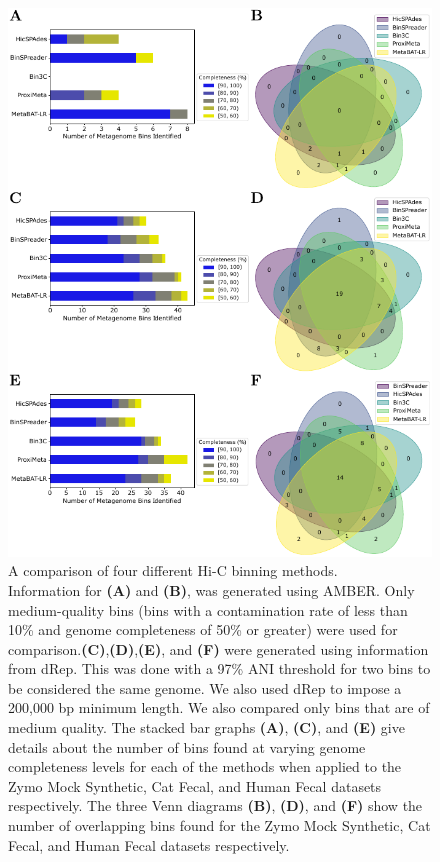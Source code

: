 \documentclass[fleqn,10pt,lineno]{wlpeerj}
\begin{document}
\begin{figure}[ht!]
\centering
\includegraphics[scale=1.17]{Fig5.pdf}
    \caption{A comparison of four different Hi-C binning methods. 
    \\Information for \textbf{(A)} and \textbf{(B)}, was generated using AMBER. Only medium-quality bins (bins with a contamination rate of less than 10\% and genome completeness of 50\% or greater) were used for comparison.\textbf{(C)},\textbf{(D)},\textbf{(E)}, and \textbf{(F)} were generated using information from dRep. This was done with a 97\% ANI threshold for two bins to be considered the same genome. We also used dRep to impose a 200,000 bp minimum length. We also compared only bins that are of medium quality. The stacked bar graphs \textbf{(A)}, \textbf{(C)}, and \textbf{(E)} give details about the number of bins found at varying genome completeness levels for each of the methods when applied to the Zymo Mock Synthetic, Cat Fecal, and Human Fecal datasets respectively. The three Venn diagrams \textbf{(B)}, \textbf{(D)}, and \textbf{(F)} show the number of overlapping bins found for the Zymo Mock Synthetic, Cat Fecal, and Human Fecal datasets respectively.}
    \label{fig:Comparison_Fig}
\end{figure}
\end{document}
